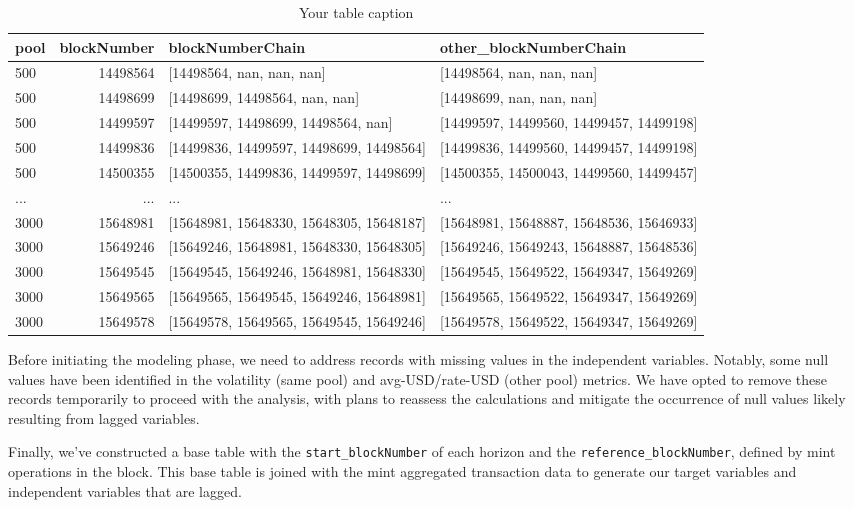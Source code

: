 \documentclass{article}
\begin{document}
{\begin{table}[htbp]
  \centering
  \small
  \begin{tabularx}{\linewidth}{|X|r|l|l|}
    \hline
    \textbf{pool} & \textbf{blockNumber} & \textbf{blockNumberChain} & \textbf{other\_blockNumberChain} \\
    \hline
    500 & 14498564 & [14498564, nan, nan, nan] & [14498564, nan, nan, nan] \\
    500 & 14498699 & [14498699, 14498564, nan, nan] & [14498699, nan, nan, nan] \\
    500 & 14499597 & [14499597, 14498699, 14498564, nan] & [14499597, 14499560, 14499457, 14499198] \\
    500 & 14499836 & [14499836, 14499597, 14498699, 14498564] & [14499836, 14499560, 14499457, 14499198] \\
    500 & 14500355 & [14500355, 14499836, 14499597, 14498699] & [14500355, 14500043, 14499560, 14499457] \\
    ... & ... & ... & ... \\
    3000 & 15648981 & [15648981, 15648330, 15648305, 15648187] & [15648981, 15648887, 15648536, 15646933] \\
    3000 & 15649246 & [15649246, 15648981, 15648330, 15648305] & [15649246, 15649243, 15648887, 15648536] \\
    3000 & 15649545 & [15649545, 15649246, 15648981, 15648330] & [15649545, 15649522, 15649347, 15649269] \\
    3000 & 15649565 & [15649565, 15649545, 15649246, 15648981] & [15649565, 15649522, 15649347, 15649269] \\
    3000 & 15649578 & [15649578, 15649565, 15649545, 15649246] & [15649578, 15649522, 15649347, 15649269] \\
    \hline
  \end{tabularx}
  \caption{Your table caption}
  \label{tab:my-table1}
\end{table}

Before initiating the modeling phase, we need to address records with missing values in the independent variables. Notably, some null values have been identified in the volatility (same pool) and avg-USD/rate-USD (other pool) metrics. We have opted to remove these records temporarily to proceed with the analysis, with plans to reassess the calculations and mitigate the occurrence of null values likely resulting from lagged variables.

Finally, we've constructed a base table with the \texttt{start\_blockNumber} of each horizon and the \texttt{reference\_blockNumber}, defined by mint operations in the block. This base table is joined with the mint aggregated transaction data to generate our target variables and independent variables that are lagged.

}
\end{document}
